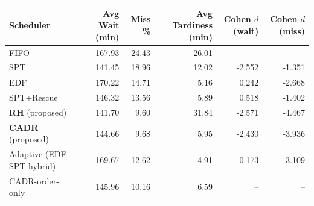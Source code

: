\begin{tabular}{lrrrrr}
\toprule
\textbf{Scheduler} & \textbf{Avg Wait (min)} & \textbf{Miss \%} & \textbf{Avg Tardiness (min)} & \textbf{Cohen $d$ (wait)} & \textbf{Cohen $d$ (miss)} \\
\midrule
FIFO & 167.93 & 24.43 & 26.01 & -- & -- \\
SPT & 141.45 & 18.96 & 12.02 & -2.552 & -1.351 \\
EDF & 170.22 & 14.71 & 5.16 & 0.242 & -2.668 \\
SPT+Rescue & 146.32 & 13.56 & 5.89 & 0.518 & -1.402 \\
\textbf{RH} (proposed) & 141.70 & 9.60 & 31.84 & -2.571 & -4.467 \\
\textbf{CADR} (proposed) & 144.66 & 9.68 & 5.95 & -2.430 & -3.936 \\
Adaptive (EDF-SPT hybrid) & 169.67 & 12.62 & 4.91 & 0.173 & -3.109 \\
\midrule
CADR-order-only & 145.96 & 10.16 & 6.59 & -- & -- \\
\bottomrule
\end{tabular}
